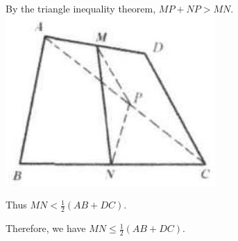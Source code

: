 \documentclass{article}
\begin{document}
By the triangle inequality theorem, \(M P+N P>M N\).\\
\centering
\includegraphics[width=\textwidth]{images/reasoning_image_1.jpg}

Thus \(M N<\frac{1}{2}(A B+D C)\).


Therefore, we have \(M N \leq \frac{1}{2}(A B+D C)\).
\end{document}
